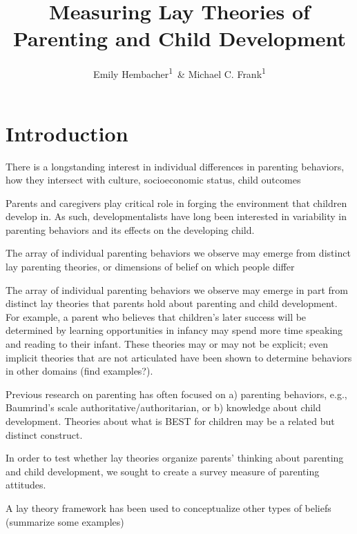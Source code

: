 \documentclass[floatsintext,man]{apa6}
\title{Measuring Lay Theories of Parenting and Child Development}
\author{Emily Hembacher\textsuperscript{1}~\& Michael C. Frank\textsuperscript{1}}
\affiliation{
    \vspace{0.5cm}
          \textsuperscript{1} Stanford University  }
\theoremstyle{definition}
\theoremstyle{definition}
\theoremstyle{definition}
\theoremstyle{remark}
\begin{document}
\maketitle

\setcounter{secnumdepth}{0}



\section{Introduction}\label{introduction}

There is a longstanding interest in individual differences in parenting
behaviors, how they intersect with culture, socioeconomic status, child
outcomes

Parents and caregivers play critical role in forging the environment
that children develop in. As such, developmentalists have long been
interested in variability in parenting behaviors and its effects on the
developing child.

The array of individual parenting behaviors we observe may emerge from
distinct lay parenting theories, or dimensions of belief on which people
differ

The array of individual parenting behaviors we observe may emerge in
part from distinct lay theories that parents hold about parenting and
child development. For example, a parent who believes that children's
later success will be determined by learning opportunities in infancy
may spend more time speaking and reading to their infant. These theories
may or may not be explicit; even implicit theories that are not
articulated have been shown to determine behaviors in other domains
(find examples?).

Previous research on parenting has often focused on a) parenting
behaviors, e.g., Baumrind's scale authoritative/authoritarian, or b)
knowledge about child development. Theories about what is BEST for
children may be a related but distinct construct.

In order to test whether lay theories organize parents' thinking about
parenting and child development, we sought to create a survey measure of
parenting attitudes.

A lay theory framework has been used to conceptualize other types of
beliefs (summarize some examples)
\end{document}
